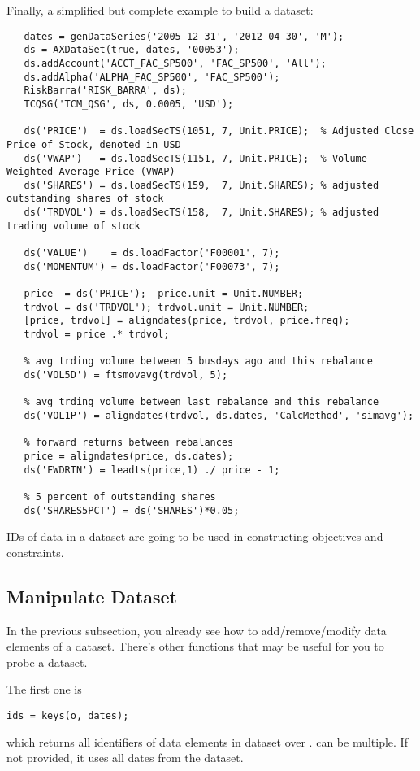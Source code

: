 Finally, a simplified but complete example to build a dataset:
\begin{lstlisting}
   dates = genDataSeries('2005-12-31', '2012-04-30', 'M');
   ds = AXDataSet(true, dates, '00053');
   ds.addAccount('ACCT_FAC_SP500', 'FAC_SP500', 'All');
   ds.addAlpha('ALPHA_FAC_SP500', 'FAC_SP500');
   RiskBarra('RISK_BARRA', ds);
   TCQSG('TCM_QSG', ds, 0.0005, 'USD');

   ds('PRICE')  = ds.loadSecTS(1051, 7, Unit.PRICE);  % Adjusted Close Price of Stock, denoted in USD
   ds('VWAP')   = ds.loadSecTS(1151, 7, Unit.PRICE);  % Volume Weighted Average Price (VWAP)
   ds('SHARES') = ds.loadSecTS(159,  7, Unit.SHARES); % adjusted outstanding shares of stock
   ds('TRDVOL') = ds.loadSecTS(158,  7, Unit.SHARES); % adjusted trading volume of stock

   ds('VALUE')    = ds.loadFactor('F00001', 7);
   ds('MOMENTUM') = ds.loadFactor('F00073', 7);
            
   price  = ds('PRICE');  price.unit = Unit.NUMBER;
   trdvol = ds('TRDVOL'); trdvol.unit = Unit.NUMBER;
   [price, trdvol] = aligndates(price, trdvol, price.freq);
   trdvol = price .* trdvol;
            
   % avg trding volume between 5 busdays ago and this rebalance
   ds('VOL5D') = ftsmovavg(trdvol, 5);

   % avg trding volume between last rebalance and this rebalance
   ds('VOL1P') = aligndates(trdvol, ds.dates, 'CalcMethod', 'simavg');
            
   % forward returns between rebalances            
   price = aligndates(price, ds.dates);
   ds('FWDRTN') = leadts(price,1) ./ price - 1;
            
   % 5 percent of outstanding shares
   ds('SHARES5PCT') = ds('SHARES')*0.05;
\end{lstlisting}

IDs of data in a dataset are going to be used in constructing objectives and constraints.

\subsection{Manipulate Dataset}

In the previous subsection, you already see how to add/remove/modify data elements of a dataset.
There's other functions that may be useful for you to probe a dataset.

The first one is
\begin{lstlisting}[numbers=none]
   ids = keys(o, dates); 
\end{lstlisting}
which returns all identifiers of data elements in dataset  over .
 can be multiple.
If not provided, it uses all dates from the dataset.

